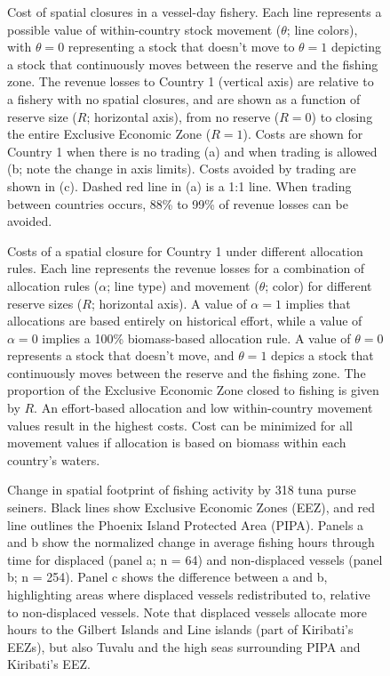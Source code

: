 \documentclass[12pt]{article}
\begin{document}
\begin{figure}[htbp]
\centering
\caption{\label{fig:PNA_model}Cost of spatial closures in a vessel-day fishery. Each line represents a possible value of within-country stock movement ($\theta$; line colors), with $\theta = 0$ representing a stock that doesn't move to $\theta = 1$ depicting a stock that continuously moves between the reserve and the fishing zone. The revenue losses to Country 1 (vertical axis) are relative to a fishery with no spatial closures, and are shown as a function of reserve size ($R$; horizontal axis), from no reserve ($R = 0$) to closing the entire Exclusive Economic Zone ($R = 1$). Costs are shown for Country 1 when there is no trading (a) and when trading is allowed (b; note the change in axis limits). Costs avoided by trading are shown in (c). Dashed red line in (a) is a 1:1 line. When trading between countries occurs, 88\% to 99\% of revenue losses can be avoided.}
\end{figure}

\begin{figure}[htbp]
\centering
\caption{\label{fig:allocation_cost_plot}Costs of a spatial closure for Country 1 under different allocation rules. Each line represents the revenue losses for a combination of allocation rules ($\alpha$; line type) and movement ($\theta$; color) for different reserve sizes ($R$; horizontal axis). A value of $\alpha = 1$ implies that allocations are based entirely on historical effort, while a value of $\alpha = 0$ implies a 100\% biomass-based allocation rule. A value of $\theta = 0$ represents a stock that doesn't move, and $\theta = 1$ depics a stock that continuously moves between the reserve and the fishing zone. The proportion of the Exclusive Economic Zone closed to fishing is given by $R$. An effort-based allocation and low within-country movement values result in the highest costs. Cost can be minimized for all movement values if allocation is based on biomass within each country's waters.}
\end{figure}

\begin{figure}
\centering
\caption{\label{fig:fishing_raster_diff}Change in spatial footprint of fishing activity by 318 tuna purse seiners. Black lines show Exclusive Economic Zones (EEZ), and red line outlines the Phoenix Island Protected Area (PIPA). Panels a and b show the normalized change in average fishing hours through time for displaced (panel a; n = 64) and non-displaced vessels (panel b; n = 254). Panel c shows the difference between a and b, highlighting areas where displaced vessels redistributed to, relative to non-displaced vessels. Note that displaced vessels allocate more hours to the Gilbert Islands and Line islands (part of Kiribati's EEZs), but also Tuvalu and the high seas surrounding PIPA and Kiribati's EEZ.}
\end{figure}
\end{document}
